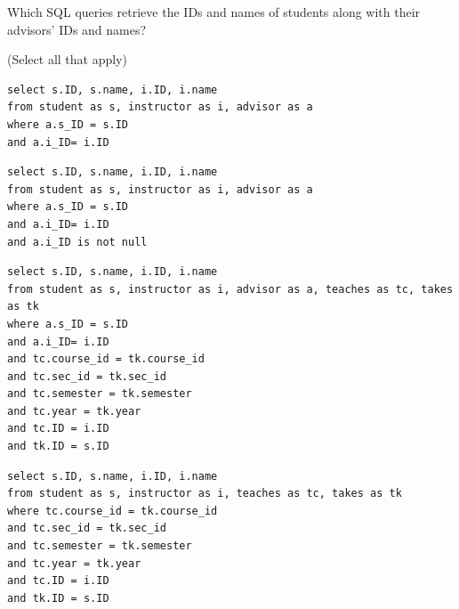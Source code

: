 \documentclass[12pt, addpoints, answers]{exam}
\begin{document}
\begin{questions}
\begin{minipage}{\linewidth}
\question[6]
Which SQL queries retrieve the IDs and names of students along with their advisors' IDs and names?\par\vspace{0.5em}
(Select all that apply)\par\vspace{0.5em}
\begin{checkboxes} 
    \CorrectChoice \begin{verbatim}
select s.ID, s.name, i.ID, i.name
from student as s, instructor as i, advisor as a
where a.s_ID = s.ID 
and a.i_ID= i.ID
    \end{verbatim}
    \CorrectChoice \begin{verbatim}
select s.ID, s.name, i.ID, i.name
from student as s, instructor as i, advisor as a
where a.s_ID = s.ID 
and a.i_ID= i.ID
and a.i_ID is not null
    \end{verbatim}
    \choice \begin{verbatim}
select s.ID, s.name, i.ID, i.name
from student as s, instructor as i, advisor as a, teaches as tc, takes as tk
where a.s_ID = s.ID 
and a.i_ID= i.ID
and tc.course_id = tk.course_id
and tc.sec_id = tk.sec_id
and tc.semester = tk.semester
and tc.year = tk.year
and tc.ID = i.ID
and tk.ID = s.ID
    \end{verbatim}
    \choice \begin{verbatim}
select s.ID, s.name, i.ID, i.name
from student as s, instructor as i, teaches as tc, takes as tk
where tc.course_id = tk.course_id
and tc.sec_id = tk.sec_id
and tc.semester = tk.semester
and tc.year = tk.year
and tc.ID = i.ID
and tk.ID = s.ID
    \end{verbatim}
\end{checkboxes}
\end{minipage}\vspace{1em}


\end{questions}
\end{document}
